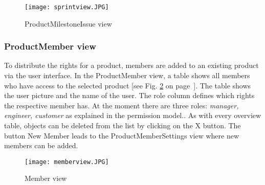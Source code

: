     \begin{figure}[h]
        \centering
        \texttt{[image: sprintview.JPG]}
        \caption{ProductMilestoneIssue view}
        \label{fig: sprintview}
    \end{figure}

    \subsubsection*{ProductMember view}
    To distribute the rights for a product, members are added to an existing product via the user interface. In the ProductMember view, a table shows all members who have access to the selected product [see Fig. \ref{fig: memberview} on page~\pageref{fig: memberview}]. The table shows the user picture and the name of the user. The role column defines which rights the respective member has. At the moment there are three roles: \textit{manager, engineer, customer} as explained in the permission model.. As with every overview table, objects can be deleted from the list by clicking on the X button. The button New Member leads to the ProductMemberSettings view where new members can be added.
    
    \begin{figure}[h]
        \centering
        \texttt{[image: memberview.JPG]}
        \caption{Member view}
        \label{fig: memberview}
    \end{figure}
